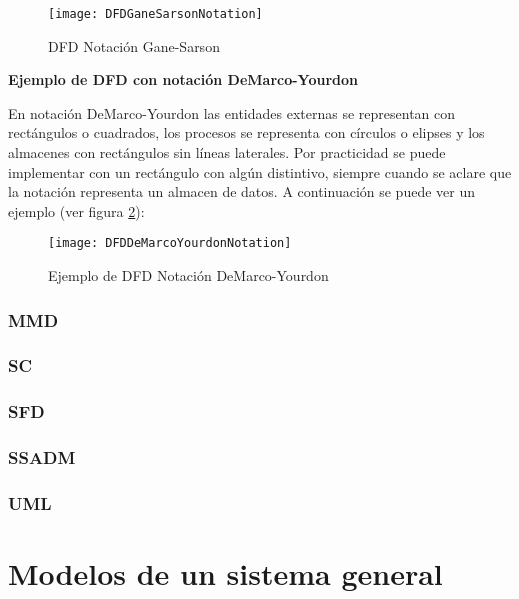 \begin{figure}[h]
  \centering
  \texttt{[image: DFDGaneSarsonNotation]}
  \caption{DFD Notación Gane-Sarson \cite{Gane-Sarson-1979}}
  \centering
  \label{fig:DFDGaneSarsonNotation} %
\end{figure}

\textbf{Ejemplo de DFD con notación DeMarco-Yourdon}

En notación DeMarco-Yourdon las entidades externas se representan con rectángulos o cuadrados, los procesos se representa con círculos o elipses y los almacenes con rectángulos sin líneas laterales. Por practicidad se puede implementar con un rectángulo con algún distintivo, siempre cuando se aclare que la notación representa un almacen de datos. A continuación se puede ver un ejemplo (ver figura \ref{fig:DFDDeMarcoYourdonNotation}):\newline
\newline

\begin{figure}[h]
  \centering
  \texttt{[image: DFDDeMarcoYourdonNotation]}
  \caption{Ejemplo de DFD Notación DeMarco-Yourdon \cite{Dixit-2007}}
  \centering
  \label{fig:DFDDeMarcoYourdonNotation} %
\end{figure}


\subsubsection{MMD}

\subsubsection{SC}

\subsubsection{SFD}

\subsubsection{SSADM}

\subsubsection{UML}

\section{Modelos de un sistema general}
